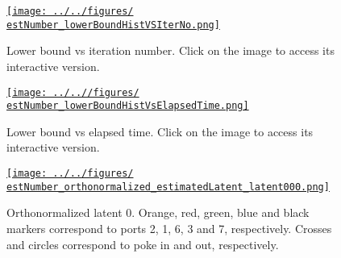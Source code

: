 \documentclass[12pt]{article}
\newcommand{\estNumber}{96129535}
\begin{document}
\begin{figure}
    \begin{center}

        \href{http://www.gatsby.ucl.ac.uk/~rapela/sthita/reports/firstReport/figures/\estNumber_lowerBoundHistVSIterNo.html}{\texttt{[image: ../../figures/\\estNumber\_lowerBoundHistVSIterNo.png]}}

        \caption{Lower bound vs iteration number. Click on the
        image to access its interactive version.}
        \label{fig:estimation-lowerBoundVsIterNo}

    \end{center}
\end{figure}


\begin{figure}
    \begin{center}

        \href{http://www.gatsby.ucl.ac.uk/~rapela/sthita/reports/firstReport/figures/\estNumber_lowerBoundHistVsElapsedTime.html}{\texttt{[image: ../..//figures/\\estNumber\_lowerBoundHistVsElapsedTime.png]}}

        \caption{Lower bound vs elapsed time. Click on the
        image to access its interactive version.}
        \label{fig:estimation-lowerBoundVsElapsedTime}

    \end{center}
\end{figure}

\begin{figure}
    \begin{center}

        \href{http://www.gatsby.ucl.ac.uk/~rapela/sthita/reports/firstReport/figures/\estNumber_orthonormalized_estimatedLatent_latent000.html}{\texttt{[image: ../../figures/\\estNumber\_orthonormalized\_estimatedLatent\_latent000.png]}}

        \caption{Orthonormalized latent 0. Orange, red, green, blue and black
        markers correspond to ports 2, 1, 6, 3 and 7, respectively. Crosses and
        circles correspond to poke in and out, respectively.}

        \label{fig:orthonornmalized-latent0}

    \end{center}
\end{figure}
\end{document}
